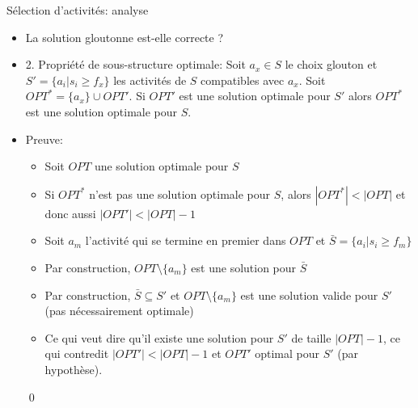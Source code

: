 \begin{frame}{Sélection d'activités: analyse}
\begin{itemize}
\item La solution gloutonne est-elle correcte ?

\bigskip

\item \alert{2. Propriété de sous-structure optimale:} Soit $a_x\in S$ le choix glouton et $S'=\{a_i|s_i\geq f_x\}$ les activités de $S$ compatibles avec $a_x$. Soit $OPT^*=\{a_x\}\cup OPT'$. Si $OPT'$ est une solution optimale pour $S'$ alors $OPT^*$ est une solution optimale pour $S$.
\item \alert{Preuve:}
\begin{itemize}
\item Soit $OPT$ une solution optimale pour $S$
\item Si $OPT^*$ n'est pas une solution optimale pour $S$, alors $|OPT^*|<|OPT|$ et donc aussi $|OPT'|<|OPT|-1$
\item Soit $a_m$ l'activité qui se termine en premier dans $OPT$ et $\bar{S}=\{a_i|s_i\geq f_m\}$
\item Par construction, $OPT\setminus\{a_m\}$ est une solution pour $\bar{S}$
\item Par construction, $\bar{S}\subseteq S'$ et $OPT\setminus\{a_m\}$
  est une solution valide pour $S'$ (pas nécessairement optimale)
\item Ce qui veut dire qu'il existe une solution pour $S'$ de taille $|OPT|-1$, ce qui contredit  $|OPT'|<|OPT|-1$ et $OPT'$ optimal pour $S'$ (par hypothèse).
\end{itemize}\qed
\end{itemize}

\end{frame}

